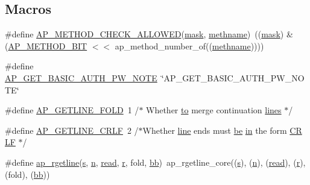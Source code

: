 \subsection*{Macros}
\begin{DoxyCompactItemize}
\item 
\#define \hyperlink{group__APACHE__CORE__PROTO_ga21b69babd24f92e0dc0ad664ca619b30}{A\+P\+\_\+\+M\+E\+T\+H\+O\+D\+\_\+\+C\+H\+E\+C\+K\+\_\+\+A\+L\+L\+O\+W\+ED}(\hyperlink{group__APR__Util__Date_ga6bd7250007a3cfeadacf370fbf68cf5a}{mask},  \hyperlink{group__APACHE__CORE__PROTO_ga881b3e130b3a53164706c3e1e76cfe7b}{methname})~((\hyperlink{group__APR__Util__Date_ga6bd7250007a3cfeadacf370fbf68cf5a}{mask}) \& (\hyperlink{group__Methods_ga2c2414cfae1856a90350b3fba8a6dde9}{A\+P\+\_\+\+M\+E\+T\+H\+O\+D\+\_\+\+B\+IT} $<$$<$ ap\+\_\+method\+\_\+number\+\_\+of((\hyperlink{group__APACHE__CORE__PROTO_ga881b3e130b3a53164706c3e1e76cfe7b}{methname}))))
\item 
\#define \hyperlink{group__APACHE__CORE__PROTO_ga2dda4a866ca39f2135b98326e57d047c}{A\+P\+\_\+\+G\+E\+T\+\_\+\+B\+A\+S\+I\+C\+\_\+\+A\+U\+T\+H\+\_\+\+P\+W\+\_\+\+N\+O\+TE}~\char`\"{}A\+P\+\_\+\+G\+E\+T\+\_\+\+B\+A\+S\+I\+C\+\_\+\+A\+U\+T\+H\+\_\+\+P\+W\+\_\+\+N\+O\+TE\char`\"{}
\item 
\#define \hyperlink{group__APACHE__CORE__PROTO_ga160736b41dc11d8872c7be9d97aa7cad}{A\+P\+\_\+\+G\+E\+T\+L\+I\+N\+E\+\_\+\+F\+O\+LD}~1 /$\ast$ Whether \hyperlink{pcretest_8txt_aa22c98f630e4b3fe86ee17ce5150c62f}{to} merge continuation \hyperlink{pcregrep_8txt_a0fcc426e1c273f0ffcfbd2e3b2412ac3}{lines} $\ast$/
\item 
\#define \hyperlink{group__APACHE__CORE__PROTO_ga2b968d6cf2ac96ca58ffee626b917aeb}{A\+P\+\_\+\+G\+E\+T\+L\+I\+N\+E\+\_\+\+C\+R\+LF}~2 /$\ast$Whether \hyperlink{README_8txt_a2cf996e2a4004681ed2e0dfbca5b7993}{line} ends must \hyperlink{NON-AUTOTOOLS-BUILD_8txt_ac08ce70cbd4f453457597ad15ecbebdd}{be} \hyperlink{group__apr__thread__proc_ga2e46fea00cc2238744ebca5061c62bcc}{in} the form \hyperlink{pcregrep_8txt_a2fcacc757c8ae01ef81fe1c3bf2e55b9}{CR} \hyperlink{pcretest_8txt_ad35f128d4e5819c911ef56fc08161a63}{LF} $\ast$/
\item 
\#define \hyperlink{group__APACHE__CORE__PROTO_ga4b31458cae55948009a7de050dd6acc4}{ap\+\_\+rgetline}(\hyperlink{pcretest_8txt_a062597889ba244b72877454b1d3adecf}{s},  \hyperlink{pcregrep_8txt_ab232d334efb9173a12ae2940d035f460}{n},  \hyperlink{pcregrep_8txt_a889d26474f6571c80796a6143c968573}{read},  \hyperlink{pcregrep_8txt_a2e9e9438b26c0bb4425367a7e4f75eb3}{r},  fold,  \hyperlink{group__MOD__PROXY_ga9313a8a2814cff280d5d780c723def3c}{bb})~ap\+\_\+rgetline\+\_\+core((\hyperlink{pcretest_8txt_a062597889ba244b72877454b1d3adecf}{s}), (\hyperlink{pcregrep_8txt_ab232d334efb9173a12ae2940d035f460}{n}), (\hyperlink{pcregrep_8txt_a889d26474f6571c80796a6143c968573}{read}), (\hyperlink{pcregrep_8txt_a2e9e9438b26c0bb4425367a7e4f75eb3}{r}), (fold), (\hyperlink{group__MOD__PROXY_ga9313a8a2814cff280d5d780c723def3c}{bb}))
$$
\end{DoxyCompactItemize}
